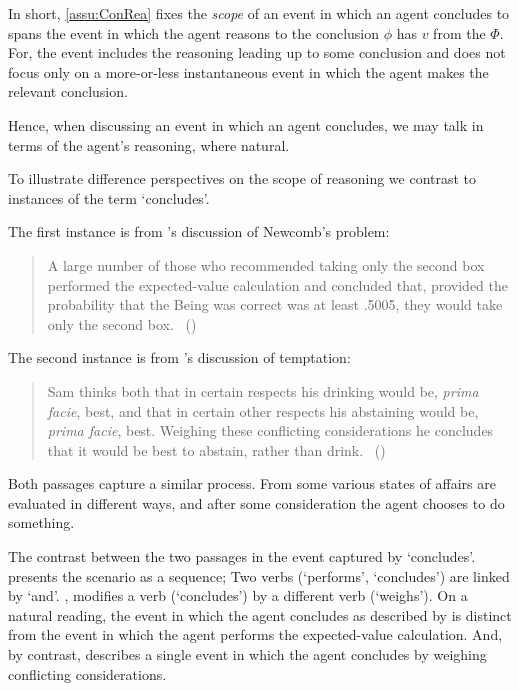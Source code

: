 \begin{note}
  In short, \autoref{assu:ConRea} fixes the \emph{scope} of an event in which an agent concludes to spans the event in which the agent reasons to the conclusion \(\phi\) has  \(v\) from the \pool{} \(\Phi\).
  For, the event includes the reasoning leading up to some conclusion and does not focus only on a more-or-less instantaneous event in which the agent makes the relevant conclusion.

    Hence, when discussing an event in which an agent concludes, we may talk in terms of the agent's reasoning, where natural.
\end{note}


\begin{note}
  To illustrate difference perspectives on the scope of reasoning we contrast to instances of the term `concludes'.

  The first instance is from \citeauthor{Gardner:1986wp}'s discussion of Newcomb's problem:
  \begin{quote}
    A large number of those who recommended taking only the second box performed the expected-value calculation and concluded that, provided the probability that the Being was correct was at least .5005, they would take only the second box.%
    \mbox{ }\hfill\mbox{(\citeyear[166]{Gardner:1986wp})}
  \end{quote}
  The second instance is from \citeauthor{Bratman:1979aa}'s discussion of temptation:
  \begin{quote}
    Sam thinks both that in certain respects his drinking would be, \emph{prima facie}, best, and that in certain other respects his abstaining would be, \emph{prima facie}, best.
    Weighing these conflicting considerations he concludes that it would be best to abstain, rather than drink.%
    \mbox{ }\hfill\mbox{(\citeyear[156]{Bratman:1979aa})}
  \end{quote}
  Both passages capture a similar process.
  From some \agpe{} various states of affairs are evaluated in different ways, and after some consideration the agent chooses to do something.

  The contrast between the two passages in the event captured by `concludes'.
  \citeauthor{Gardner:1986wp} presents the scenario as a sequence;
  Two verbs (`performs', `concludes') are linked by `and'.
  \citeauthor{Bratman:1979aa}, modifies a verb (`concludes') by a different verb (`weighs').
  On a natural reading, the event in which the agent concludes as described by \citeauthor{Gardner:1986wp} is distinct from the event in which the agent performs the expected-value calculation.
  And, by contrast, \citeauthor{Bratman:1979aa} describes a single event in which the agent concludes by weighing conflicting considerations.


\end{note}
